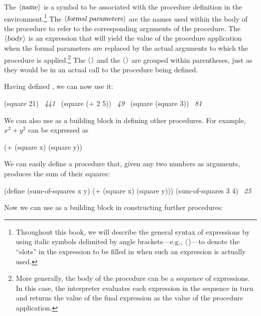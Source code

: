 \noindent
The \( \langle \text{\textsl{name}} \rangle \) is a symbol to be associated with the procedure definition in
the environment.\footnote{Throughout this book, we will describe the general
syntax of expressions by using italic symbols delimited by angle
brackets---e.g., \( \langle \)\( \kern0.08em\rangle \)---to denote the ``slots'' in the expression to be
filled in when such an expression is actually used.} The \( \langle \text{\textsl{formal parameters}} \rangle \) are the names used within the body of the procedure to refer to
the corresponding arguments of the procedure.  The \( \langle \text{\textsl{body}} \rangle \) is an
expression that will yield the value of the procedure application when the
formal parameters are replaced by the actual arguments to which the procedure
is applied.\footnote{More generally, the body of the procedure can be a
sequence of expressions.  In this case, the interpreter evaluates each
expression in the sequence in turn and returns the value of the final
expression as the value of the procedure application.}  The \( \langle \)\( \kern0.08em\rangle \) and
the \( \langle \)\( \kern0.08em\rangle \) are grouped within parentheses, just as they
would be in an actual call to the procedure being defined.

Having defined , we can now use it:

\begin{codeBlock}
(square 21)
~\textit{441}~
(square (+ 2 5))
~\textit{49}~
(square (square 3))
~\textit{81}~
\end{codeBlock}

\noindent
We can also use  as a building block in defining other procedures.
For example, \( x^2 + y^2 \) can be expressed as

\begin{codeBlock}
(+ (square x) (square y))
\end{codeBlock}

\noindent
We can easily define a procedure  that, given any two
numbers as arguments, produces the sum of their squares:

\begin{codeBlock}
(define (sum-of-squares x y)
  (+ (square x) (square y)))
(sum-of-squares 3 4)
~\textit{25}~
\end{codeBlock}

\noindent
Now we can use  as a building block in constructing
further procedures:

